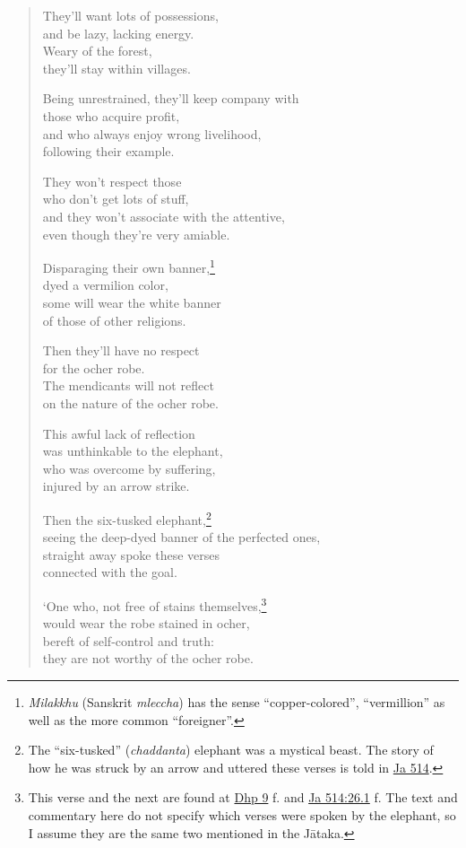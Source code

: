 \documentclass[12pt,openany]{book}%
\begin{document}
\begin{verse}
They’ll want lots of possessions, \\
and be lazy, lacking energy. \\
Weary of the forest, \\
they’ll stay within villages. 

Being unrestrained, they’ll keep company with \\
those who acquire profit, \\
and who always enjoy wrong livelihood, \\
following their example. 

They won’t respect those \\
who don’t get lots of stuff, \\
and they won’t associate with the attentive, \\
even though they’re very amiable. 

Disparaging their own banner,\footnote{\textit{Milakkhu} (Sanskrit \textit{mleccha}) has the sense “copper-colored”, “vermillion” as well as the more common “foreigner”. } \\
dyed a vermilion color, \\
some will wear the white banner \\
of those of other religions. 

Then they’ll have no respect \\
for the ocher robe. \\
The mendicants will not reflect \\
on the nature of the ocher robe. 

This awful lack of reflection \\
was unthinkable to the elephant, \\
who was overcome by suffering, \\
injured by an arrow strike. 

Then the six-tusked elephant,\footnote{The “six-tusked” (\textit{chaddanta}) elephant was a mystical beast. The story of how he was struck by an arrow and uttered these verses is told in \href{https://suttacentral.net/ja514/en/sujato}{Ja 514}. } \\
seeing the deep-dyed banner of the perfected ones, \\
straight away spoke these verses \\
connected with the goal. 

‘One who, not free of stains themselves,\footnote{This verse and the next are found at \href{https://suttacentral.net/dhp9/en/sujato}{Dhp 9} f. and \href{https://suttacentral.net/ja514/en/sujato\#26.1}{Ja 514:26.1} f. The text and commentary here do not specify which verses were spoken by the elephant, so I assume they are the same two mentioned in the \textsanskrit{Jātaka}. } \\
would wear the robe stained in ocher, \\
bereft of self-control and truth: \\
they are not worthy of the ocher robe. 


\end{verse}
\end{document}
